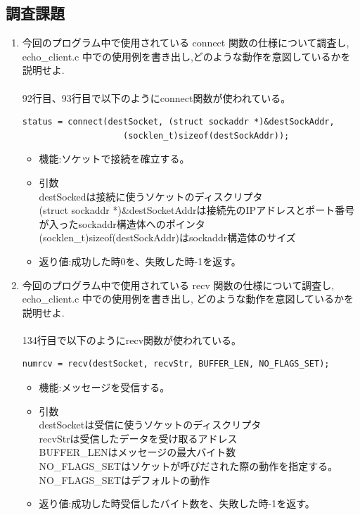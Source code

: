\documentclass[a4j]{celb-report}
\begin{document}
\subsection{調査課題}
\begin{enumerate}
 \renewcommand{\labelenumi}{(\arabic{enumi})}
 \item 今回のプログラム中で使用されている connect 関数の仕様について調査し, echo\_client.c 中での使用例を書き出し,どのような動作を意図しているかを説明せよ.\\
\\
92行目、93行目で以下のようにconnect関数が使われている。
  \begin{lstlisting}[basicstyle=\ttfamily\footnotesize, frame=single]
    status = connect(destSocket, (struct sockaddr *)&destSockAddr, 
                    (socklen_t)sizeof(destSockAddr));
  \end{lstlisting}
  \begin{itemize}
   \item 機能:ソケットで接続を確立する。
   \item 引数\\
destSockedは接続に使うソケットのディスクリプタ\\
(struct sockaddr *)\&destSocketAddrは接続先のIPアドレスとポート番号が入ったsockaddr構造体へのポインタ\\
(socklen\_t)sizeof(destSockAddr)はsockaddr構造体のサイズ
   \item 返り値:成功した時0を、失敗した時-1を返す。
  \end{itemize}
 \item 今回のプログラム中で使用されている recv 関数の仕様について調査し, echo\_client.c 中での使用例を書き出し, どのような動作を意図しているかを説明せよ.\\
\\
134行目で以下のようにrecv関数が使われている。
  \begin{lstlisting}[basicstyle=\ttfamily\footnotesize, frame=single]
        numrcv = recv(destSocket, recvStr, BUFFER_LEN, NO_FLAGS_SET);
  \end{lstlisting}
  \begin{itemize}
   \item 機能:メッセージを受信する。
   \item 引数\\
destSocketは受信に使うソケットのディスクリプタ\\
recvStrは受信したデータを受け取るアドレス\\
BUFFER\_LENはメッセージの最大バイト数\\
NO\_FLAGS\_SETはソケットが呼びだされた際の動作を指定する。NO\_FLAGS\_SETはデフォルトの動作
   \item 返り値:成功した時受信したバイト数を、失敗した時-1を返す。
  \end{itemize}
\end{enumerate}
\end{document}
